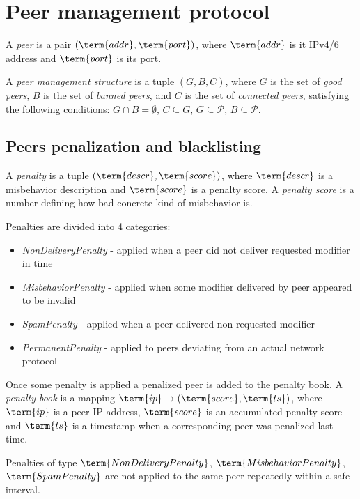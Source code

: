 \section{Peer management protocol}\label{sec:peer-management-protocol}

\newcommand{\peers}{\mathcal{P}}

A \emph{peer} is a pair $(\term{addr}, \term{port})$,
where $\term{addr}$ is it IPv4/6 address and $\term{port}$ is its port.

A \emph{peer management structure} is a tuple $(G, B, C)$,
where $G$ is the set of \emph{good peers}, $B$ is the set of \emph{banned peers}, and
$C$ is the set of \emph{connected peers}, satisfying the following conditions:
$G \cap B = \emptyset$,
$C \subseteq G$,
$G \subseteq \peers$,
$B \subseteq \peers$.

\subsection{Peers penalization and blacklisting}\label{subsec:peers-penalization-and-blacklisting}

A \emph{penalty} is a tuple $(\term{descr}, \term{score})$, where $\term{descr}$ is a misbehavior
description and $\term{score}$ is a penalty score.
A \emph{penalty score} is a number defining how bad concrete kind of misbehavior is.

Penalties are divided into 4 categories:

\begin{itemize}
    \item{\em NonDeliveryPenalty} - applied when a peer did not deliver requested modifier in time
    \item{\em MisbehaviorPenalty} - applied when some modifier delivered by peer appeared to be invalid
    \item{\em SpamPenalty} - applied when a peer delivered non-requested modifier
    \item{\em PermanentPenalty} - applied to peers deviating from an actual network protocol
\end{itemize}

Once some penalty is applied a penalized peer is added to the penalty book.
A \emph{penalty book} is a mapping $\term{ip} \rightarrow (\term{score}, \term{ts})$, where $\term{ip}$
is a peer IP address, $\term{score}$ is an accumulated penalty score and $\term{ts}$ is a timestamp when a corresponding
peer was penalized last time.

Penalties of type $\term{NonDeliveryPenalty}$, $\term{MisbehaviorPenalty}$, $\term{SpamPenalty}$ are not applied
to the same peer repeatedly within a safe interval.

